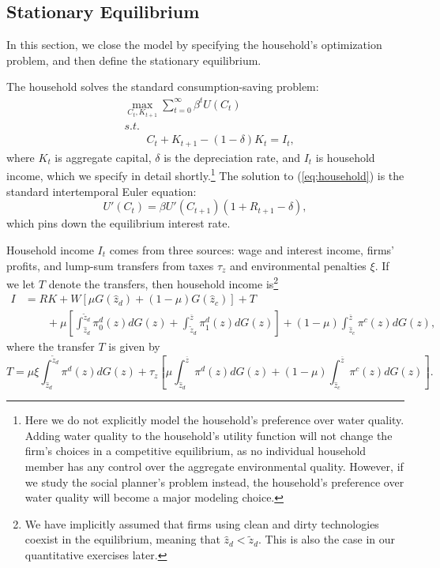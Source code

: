 \documentclass[AEJ]{AEA}
\begin{document}
\subsection{Stationary Equilibrium}

In this section, we close the model by specifying the household's optimization problem, and then define the stationary equilibrium.

The household solves the standard consumption-saving problem:
\begin{align}
\label{eq:household}
    & \max_{C_t, K_{t+1}} \sum_{t=0}^{\infty} \beta^t U(C_t) \\
    & s.t.  \nonumber \\
    & \qquad C_t + K_{t+1} - (1-\delta)K_t = I_t, \nonumber
\end{align}
where $K_t$ is aggregate capital, $\delta$ is the depreciation rate, and $I_t$ is household income, which we specify in detail shortly.\footnote{Here we do not explicitly model the household's preference over water quality. Adding water quality to the household's utility function will not change the firm's choices in a competitive equilibrium, as no individual household member has any control over the aggregate environmental quality. However, if we study the social planner's problem instead, the household's preference over water quality will become a major modeling choice.} The solution to (\ref{eq:household}) is the standard intertemporal Euler equation:
\begin{equation*}
    U'(C_t) = \beta U'(C_{t+1})(1+R_{t+1}-\delta),
\end{equation*}
which pins down the equilibrium interest rate.

Household income $I_t$ comes from three sources: wage and interest income, firms' profits, and lump-sum transfers from taxes $\tau_z$ and environmental penalties $\xi$. If we let $T$ denote the transfers, then household income is\footnote{We have implicitly assumed that firms using clean and dirty technologies coexist in the equilibrium, meaning that $\hat{z}_d<\tilde{z}_d$. This is also the case in our quantitative exercises later.}
\begin{align*}
    I &= R K + W [\mu G(\hat{z}_d)+(1-\mu)G(\hat{z}_c)] + T \\
      & \qquad + \mu\left[\int_{\hat{z}_d}^{\tilde{z}_d} \pi^d_0(z) dG(z) + \int_{\tilde{z}_d}^{\overline{z}} \pi^d_1(z)dG(z)\right] + (1-\mu)\int_{\hat{z}_c}^{\overline{z}}\pi^c(z)dG(z),
\end{align*}
where the transfer $T$ is given by
\begin{equation*}
    T = \mu\xi\int_{\hat{z}_d}^{\tilde{z}_d}\pi^d(z)dG(z) + \tau_z\left[\mu \int_{\hat{z}_d}^{\overline{z}} \pi^d(z) dG(z) + (1-\mu)\int_{\hat{z}_c}^{\overline{z}} \pi^c(z) dG(z) \right].
\end{equation*}
\end{document}
